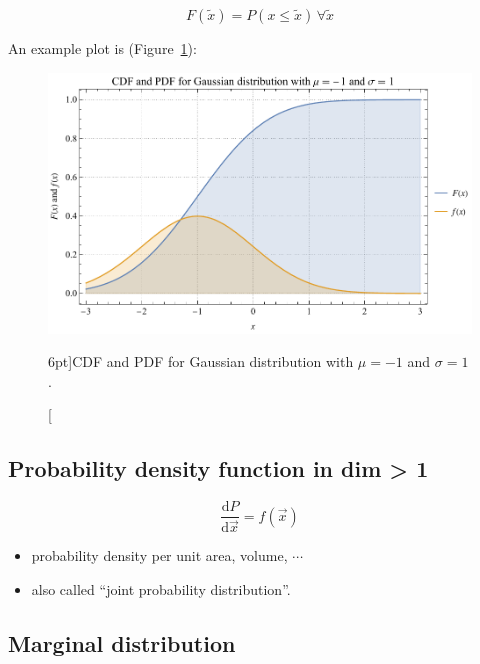 \begin{equation}
	F(\tilde{x}) = P(x \leq \tilde{x}) \,\forall \tilde{x}
\end{equation}

An example plot is (Figure~\ref{fig:CDF_PDF_Gaussian}):

\begin{figure}
	\includegraphics{probability/CDF_PDF_Gaussian.pdf}
	\caption[CDF and PDF for Gaussian distribution.][6pt]{CDF and PDF for Gaussian distribution with $\mu = -1$ and $\sigma = 1$.}
	\label{fig:CDF_PDF_Gaussian}
\end{figure}

\subsection{Probability density function in dim > 1}
\label{subsec:joint_prob_distr}

\begin{equation}
	\frac{\mathrm{d}P}{\mathrm{d}\vec{x}} = f(\vec{x})
\end{equation}

\begin{itemize}[$\to$]
	\item probability density per unit area, volume, $\cdots$
	\item also called “joint probability distribution”.
\end{itemize}

\subsection{Marginal distribution}
\label{subsec:marginal_distr}

